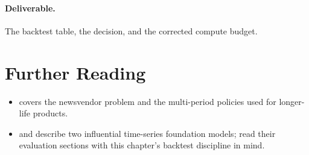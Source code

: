 \paragraph{Deliverable.} The backtest table, the decision, and the corrected compute budget.

\section*{Further Reading}

\begin{itemize}[itemsep=2pt]
  \item \citet{silver2017inventory} covers the newsvendor problem and the multi-period policies used for longer-life products.
  \item \citet{ansari2024chronos} and \citet{das2024timesfm} describe two influential time-series foundation models; read their evaluation sections with this chapter's backtest discipline in mind.
\end{itemize}
